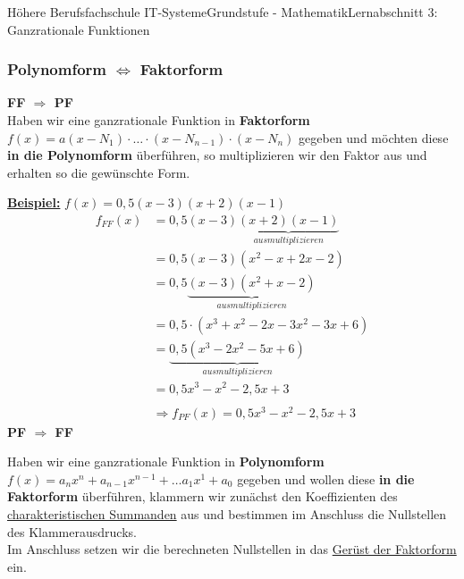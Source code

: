 \documentclass[11pt,twocolumn,oneside,openany,headings=optiontotoc,11pt,numbers=noenddot]{article}
\begin{document}
\begin{worksheet}{Höhere Berufsfachschule IT-Systeme}{Grundstufe - Mathematik}{Lernabschnitt 3: Ganzrationale Funktionen}
		\subsubsection*{Polynomform \(\Leftrightarrow\) Faktorform}
		\textbf{FF \(\Rightarrow\) PF}\\
		Haben wir eine ganzrationale Funktion in \textbf{Faktorform} \(f(x) = a(x-N_1)\cdot\ldots\cdot(x-N_{n-1})\cdot(x-N_{n})\) gegeben und möchten diese \textbf{in die Polynomform} überführen, so multiplizieren wir den Faktor aus und erhalten so die gewünschte Form.\\
		\par\noindent
		\underline{\textbf{Beispiel:}} \(f(x) = 0,5(x-3)(x+2)(x-1)\)
		\begin{align*}
			f_{FF}(x) & = 0,5(x-3)\underbrace{(x+2)(x-1)}_{ausmultiplizieren}\\
			& = 0,5(x-3)(x^2 - x +2x -2)\\
			& = 0,5\underbrace{(x-3)(x^2 + x -2)}_{ausmultiplizieren}\\
			& = 0,5\cdot(x^3 +x^2 -2x -3x^2 -3x +6)\\
			& = \underbrace{0,5(x^3 -2x^2 -5x +6)}_{ausmultiplizieren}\\
			& = 0,5x^3 - x^2 -2,5x +3\\
			\\
			& \Rightarrow f_{PF}(x) = 0,5x^3 -x^2 -2,5x + 3
		\end{align*}
		\textbf{PF \(\Rightarrow\) FF}\\
		\par\noindent
		Haben wir eine ganzrationale Funktion in \textbf{Polynomform} \(f(x) = a_nx^n + a_{n-1}x^{n-1} + \ldots a_1x^1 + a_0\) gegeben und wollen diese \textbf{in die Faktorform} überführen, klammern wir zunächst den Koeffizienten des \underline{charakteristischen Summanden} aus und bestimmen im Anschluss die Nullstellen des Klammerausdrucks.\\
		Im Anschluss setzen wir die berechneten Nullstellen in das \underline{Gerüst der Faktorform} ein.\\
		\par\noindent
	\end{worksheet}
\end{document}

